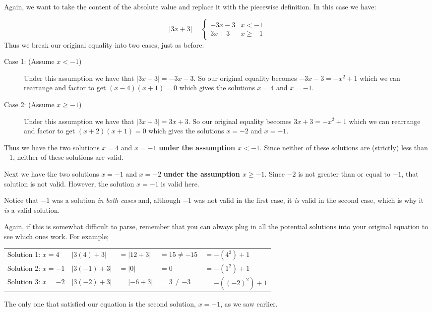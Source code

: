 \documentclass{ximeraXloud}
\begin{document}
Again, we want to take the content of the absolute value and replace it with the piecewise definition. In this case we have:

\[
    |3x+3| = 
        \begin{cases}
            -3x - 3 & x < - 1 \\
            3x + 3 & x \geq - 1
        \end{cases}
\]
Thus we break our original equality into two cases, just as before:

\begin{description}
    \item[Case 1: (Assume $x < -1$)] Under this assumption we have that $|3x + 3| = -3x - 3$. So our original equality becomes $-3x - 3 = -x^2 + 1$ which we can rearrange and factor to get $(x -4)(x + 1) = 0$ which gives the solutions $x = 4$ and $x = -1$. 
    \item[Case 2: (Assume $x \geq -1$)] Under this assumption we have that $|3x + 3| = 3x + 3$. So our original equality becomes $3x + 3 = -x^2 + 1$ which we can rearrange and factor to get $(x + 2)(x + 1) = 0$ which gives the solutions $x = -2$ and $x = -1$.
\end{description}

Thus we have the two solutions $x = 4$ and $x = -1$ \textbf{under the assumption $x < -1$}. Since neither of these solutions are (strictly) less than $-1$, neither of these solutions are valid.

Next we have the two solutions $x = -1$ and $x = -2$ \textbf{under the assumption $x \geq -1$}. Since $-2$ is not greater than or equal to $-1$, that solution is not valid. However, the solution $x = -1$ is valid here.

Notice that $-1$ was a solution \textit{in both cases} and, although $-1$ was not valid in the first case, it \textit{is} valid in the second case, which is why it \textit{is} a valid solution.

Again, if this is somewhat difficult to parse, remember that you can always plug in all the potential solutions into your original equation to see which ones work. For example;

\begin{tabularx}{\textwidth}{lllll}
    Solution 1: $x = 4$     & $|3(4) + 3|$  & $= |12 + 3|$  & $= 15 \neq -15$   & $= -(4^2) + 1$\\
    Solution 2: $x = -1$    & $|3(-1) + 3|$ & $= |0|$       & $= 0 $            & $= -(1^2) + 1$\\
    Solution 3: $x = -2$    & $|3(-2) + 3|$ & $= |-6 + 3|$  & $= 3 \neq -3$     & $= -((-2)^2) + 1$
\end{tabularx}

The only one that satisfied our equation is the second solution, $x = -1$, as we saw earlier.
\end{document}
